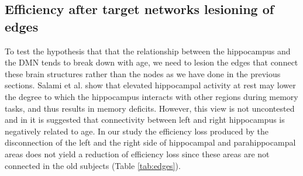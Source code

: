 \documentclass[12pt,a4paper]{article}
\begin{document}
\subsection{Efficiency after target networks lesioning of edges}
\label{ss:edges}
To test the hypothesis that that the relationship between the hippocampus and the DMN tends to break down with age, we need to lesion the edges that connect these brain structures rather than the nodes as we have done in the previous sections. 
Salami et al. show that \cite{salami_elevated_2014} elevated hippocampal activity at rest may lower the degree to which the hippocampus interacts with other regions during memory tasks, and thus results in memory deficits. However, this view is not uncontested and in \cite{Damoiseaux_2015} it is suggested that connectivity between left and right hippocampus is negatively related to age.
In our study the efficiency loss produced by the disconnection of the left and the right side of hippocampal and parahippocampal areas does not yield a reduction of efficiency loss since these areas are not connected in the old subjects (Table \ref{tab:edges}). 
\end{document}
